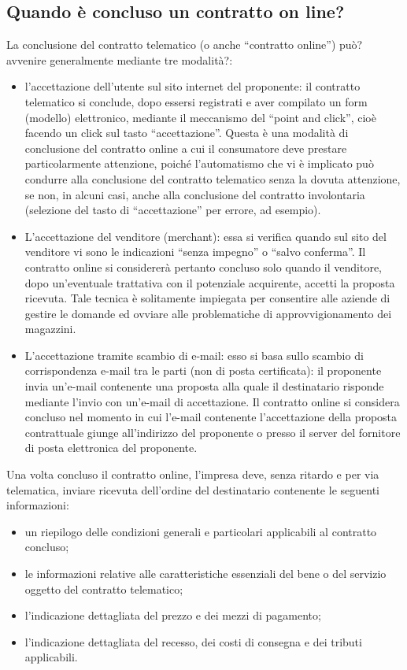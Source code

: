 \subsection{Quando è concluso un contratto on line?}
La conclusione del contratto telematico (o anche “contratto online”) può? avvenire generalmente mediante tre modalità?:
\begin{itemize}
    \item l’accettazione dell’utente sul sito internet del proponente: il contratto telematico si conclude, dopo essersi registrati e aver compilato un form (modello) elettronico, mediante il meccanismo del “point and click”, cioè facendo un click sul tasto “accettazione”. Questa è una modalità di conclusione del contratto online a cui il consumatore deve prestare particolarmente attenzione, poiché l’automatismo che vi è implicato può condurre alla conclusione del contratto telematico senza la dovuta attenzione, se non, in alcuni casi, anche alla conclusione del contratto involontaria (selezione del tasto di “accettazione” per errore, ad esempio).
    \item L’accettazione del venditore (merchant):  essa si verifica quando sul sito del venditore vi sono le indicazioni “senza impegno” o “salvo conferma”. Il contratto online si considererà pertanto concluso solo quando il venditore, dopo un’eventuale trattativa con il potenziale acquirente, accetti la proposta ricevuta. Tale tecnica è solitamente impiegata per consentire alle aziende di gestire le domande ed ovviare alle problematiche di approvvigionamento dei magazzini.
    \item L’accettazione tramite scambio di e-mail: esso si basa sullo scambio di corrispondenza e-mail tra le parti (non di posta certificata): il proponente invia un’e-mail contenente una proposta alla quale il destinatario risponde mediante l’invio con un’e-mail di accettazione. Il contratto online si considera concluso nel momento in cui l’e-mail contenente l’accettazione della proposta contrattuale giunge all’indirizzo del proponente o presso il server del fornitore di posta elettronica del proponente.
\end{itemize}
Una volta concluso il contratto online, l’impresa deve, senza ritardo e per via telematica, inviare ricevuta dell'ordine del destinatario contenente le seguenti informazioni:
\begin{itemize}
    \item un riepilogo delle condizioni generali e particolari applicabili al contratto concluso;
    \item le informazioni relative alle caratteristiche essenziali del bene o del servizio oggetto del contratto telematico;
    \item l'indicazione dettagliata del prezzo e dei mezzi di pagamento;
    \item l'indicazione dettagliata del recesso, dei costi di consegna e dei tributi applicabili.
\end{itemize}
